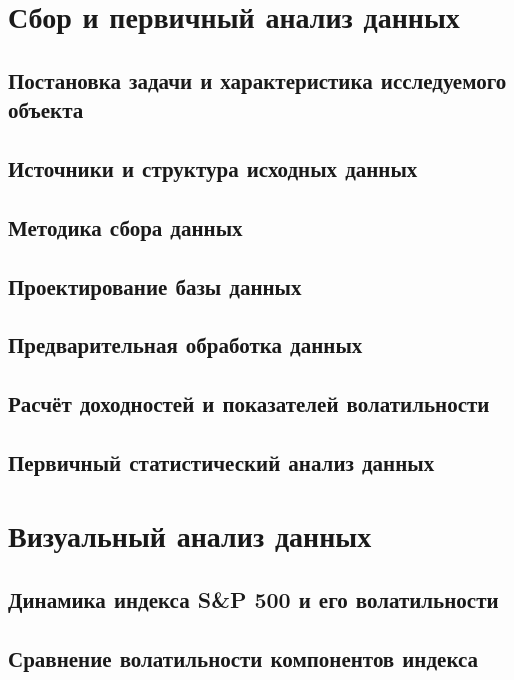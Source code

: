 \documentclass[12pt]{article}
\begin{document}
\newpage

\section{Сбор и первичный анализ данных}

\subsection{Постановка задачи и характеристика исследуемого объекта}

\subsection{Источники и структура исходных данных}

\subsection{Методика сбора данных}

\subsection{Проектирование базы данных}

\subsection{Предварительная обработка данных}

\subsection{Расчёт доходностей и показателей волатильности}

\subsection{Первичный статистический анализ данных}

\newpage

\section{Визуальный анализ данных}

\subsection{Динамика индекса S\&P 500 и его волатильности}

\subsection{Сравнение волатильности компонентов индекса}
\end{document}
